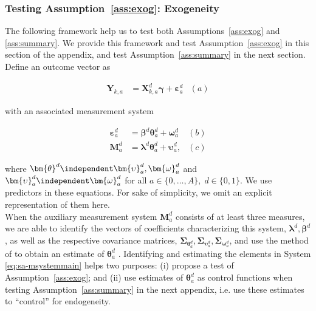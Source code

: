 \subsubsection{Testing Assumption~\ref{ass:exog}: Exogeneity} \label{app:endogeneity}

\noindent The following framework help us to test both Assumptions~\ref{ass:exog} and \ref{ass:summary}. We provide this framework and test Assumption~\ref{ass:exog} in this section of the appendix, and test Assumption~\ref{ass:summary} in the next section.\\

\noindent Define an outcome vector as

\begin{align}
\bm{Y}_{k,a} &= \bm{X}^d_{k,a} \bm{\gamma} + \bm{\varepsilon}^d_a  &(a) \nonumber
\end{align}

\noindent with an associated measurement system

\begin{align}  \label{eq:sa-msystemmain}
\bm{\varepsilon}_{a}^d &=\bm{\beta}^d \bm{\theta}_{a}^d + \bm{\omega}_{a}^d  &(b) \nonumber \\
\bm{M}_{a}^d &= \bm{\lambda}^d \bm{\theta}_{a}^d + \bm{\upsilon}_a^d,  &(c)
\end{align}


\noindent where $\bm{\theta}^d \independent \bm{\upsilon}_{a}^d, \bm{\omega}_{a}^d$ and $\bm{\upsilon}_{a}^d \independent \bm{\omega}_{a}^d$ for all $a \in \{0, \ldots, A \}, \; d \in \{0,1\}$. We use predictors in these equations. For sake of simplicity, we omit an explicit representation of them here.\\

\noindent When the auxiliary measurement system $\bm{M}_{a}^d $ consists of at least three measures, we are able to identify the vectors of coefficients characterizing this system, $\bm{\lambda}^d, \bm{\beta}^d$, as well as the respective covariance matrices, $\bm{\Sigma}_{\bm{\theta}_{a}^d}, \bm{\Sigma}_{\bm{\upsilon}_{a}^d}, \bm{\Sigma}_{\bm{\omega}_{a}^d}$, and use the method of \citet{Bartlett_1938_Nature} to obtain an estimate of $\bm{\theta}_{a}^d$ \citep{Heckman_Pinto_etal_2013_PerryFactor}. Identifying and estimating the elements in System \eqref{eq:sa-msystemmain} helps two purposes: (i) propose a test of Assumption~\ref{ass:exog}; and (ii) use estimates of $\bm{\theta}_{a}^d$ as control functions when testing Assumption~\ref{ass:summary} in the next appendix, i.e. use these estimates to ``control'' for endogeneity.\\

